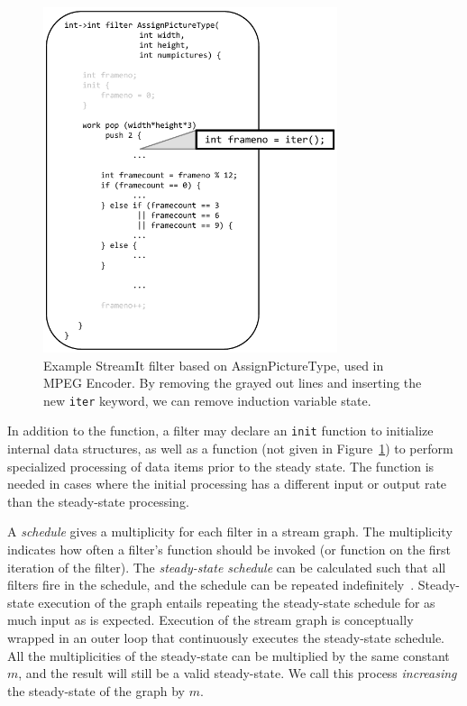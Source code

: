 \begin{figure}[t]
\centering
\includegraphics[width=3.4in]{figures/streamit-filter-example.pdf}
\caption{Example StreamIt filter based on AssignPictureType, used in MPEG Encoder. By removing the grayed out lines and inserting the new {\tt iter} keyword, we can remove induction variable state. \protect\label{fig:apt-pipeline}}
\end{figure}

In addition to the \work function, a filter may declare an {\tt init}
function to initialize internal data structures, as well as a 
 \prework function (not given in Figure~\ref{fig:apt-pipeline}) to
perform specialized processing of data items prior to the steady
state.  The \prework function is needed in cases where the initial
processing has a different input or output rate than the steady-state
processing.

A {\it schedule} gives a multiplicity for each filter in a stream
graph.  The multiplicity indicates how often a filter's \work function
should be invoked (or \prework function on the first iteration of the filter).  The
{\it steady-state schedule} can be calculated such that all filters
fire in the schedule, and the schedule can be repeated
indefinitely~\cite{lee87}.  Steady-state execution of the graph
entails repeating the steady-state schedule for as much input as is
expected.  Execution of the stream graph is conceptually wrapped in an
outer loop that continuously executes the steady-state schedule.  All
the multiplicities of the steady-state can be multiplied by the same
constant $m$, and the result will still be a valid steady-state.  We
call this process {\it increasing} the steady-state of the graph by
$m$.

